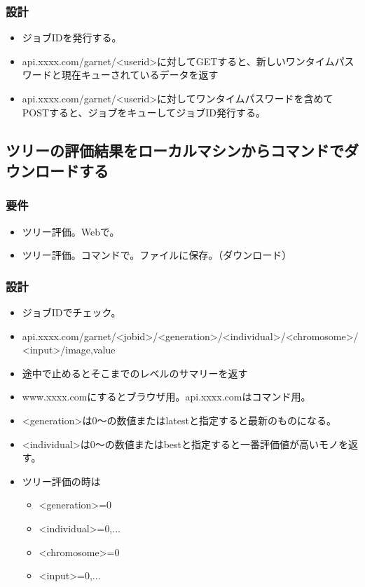 \documentclass{jsbook}
\begin{document}
\subsubsection{設計}
\begin{itemize}
	\item ジョブIDを発行する。
	\item api.xxxx.com/garnet/<userid>に対してGETすると、新しいワンタイムパスワードと現在キューされているデータを返す
	\item api.xxxx.com/garnet/<userid>に対してワンタイムパスワードを含めてPOSTすると、ジョブをキューしてジョブID発行する。
\end{itemize}


\subsection{ツリーの評価結果をローカルマシンからコマンドでダウンロードする}

\subsubsection{要件}

\begin{itemize}
	\item ツリー評価。Webで。
	\item ツリー評価。コマンドで。ファイルに保存。（ダウンロード）
\end{itemize}

\subsubsection{設計}
\begin{itemize}
	\item ジョブIDでチェック。
	\item api.xxxx.com/garnet/<jobid>/<generation>/<individual>/<chromosome>/<input>/{image,value}
	\item 途中で止めるとそこまでのレベルのサマリーを返す
	\item www.xxxx.comにするとブラウザ用。api.xxxx.comはコマンド用。
	\item <generation>は0～の数値またはlatestと指定すると最新のものになる。
	\item <individual>は0～の数値またはbestと指定すると一番評価値が高いモノを返す。
	\item ツリー評価の時は
	\begin{itemize}
		\item <generation>={0}
		\item <individual>={0,...}
		\item <chromosome>={0}
		\item <input>={0,...}
	\end{itemize}
\end{itemize}
\end{document}
